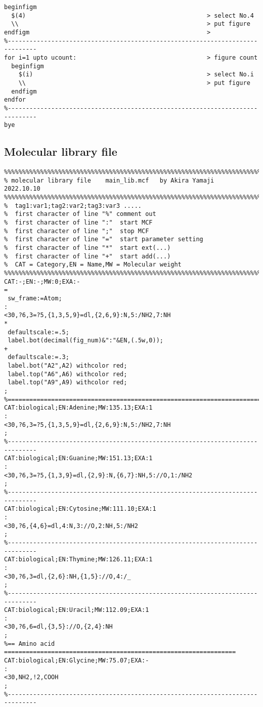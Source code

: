 \documentclass[a4paper]{article}
\begin{document}
\begin{verbatim}
beginfigm
  $(4)                                                  > select No.4
  \\                                                    > put figure
endfigm                                                 >
%------------------------------------------------------------------------------
for i=1 upto ucount:                                    > figure count
  beginfigm
    $(i)                                                > select No.i
    \\                                                  > put figure
  endfigm
endfor
%------------------------------------------------------------------------------
bye
\end{verbatim}
\noindent%
\newpage
\subsection{Molecular library file}
\begin{verbatim}
%%%%%%%%%%%%%%%%%%%%%%%%%%%%%%%%%%%%%%%%%%%%%%%%%%%%%%%%%%%%%%%%%%%%%%%%%%%%%%%
% molecular library file    main_lib.mcf   by Akira Yamaji   2022.10.10
%%%%%%%%%%%%%%%%%%%%%%%%%%%%%%%%%%%%%%%%%%%%%%%%%%%%%%%%%%%%%%%%%%%%%%%%%%%%%%%
%  tag1:var1;tag2:var2;tag3:var3 .....
%  first character of line "%" comment out
%  first character of line ":"  start MCF
%  first character of line ";"  stop MCF
%  first character of line "="  start parameter setting
%  first character of line "*"  start ext(...)
%  first character of line "+"  start add(...)
%  CAT = Category,EN = Name,MW = Molecular weight
%%%%%%%%%%%%%%%%%%%%%%%%%%%%%%%%%%%%%%%%%%%%%%%%%%%%%%%%%%%%%%%%%%%%%%%%%%%%%%%
CAT:-;EN:-;MW:0;EXA:-
=
 sw_frame:=Atom;
:
<30,?6,3=?5,{1,3,5,9}=dl,{2,6,9}:N,5:/NH2,7:NH
*
 defaultscale:=.5;
 label.bot(decimal(fig_num)&":"&EN,(.5w,0));
+
 defaultscale:=.3;
 label.bot("A2",A2) withcolor red;
 label.top("A6",A6) withcolor red;
 label.top("A9",A9) withcolor red;
;
%==============================================================================
CAT:biological;EN:Adenine;MW:135.13;EXA:1
:
<30,?6,3=?5,{1,3,5,9}=dl,{2,6,9}:N,5:/NH2,7:NH
;
%------------------------------------------------------------------------------
CAT:biological;EN:Guanine;MW:151.13;EXA:1
:
<30,?6,3=?5,{1,3,9}=dl,{2,9}:N,{6,7}:NH,5://O,1:/NH2
;
%------------------------------------------------------------------------------
CAT:biological;EN:Cytosine;MW:111.10;EXA:1
:
<30,?6,{4,6}=dl,4:N,3://O,2:NH,5:/NH2
;
%------------------------------------------------------------------------------
CAT:biological;EN:Thymine;MW:126.11;EXA:1
:
<30,?6,3=dl,{2,6}:NH,{1,5}://O,4:/_
;
%------------------------------------------------------------------------------
CAT:biological;EN:Uracil;MW:112.09;EXA:1
:
<30,?6,6=dl,{3,5}://O,{2,4}:NH
;
%== Amino acid ================================================================
CAT:biological;EN:Glycine;MW:75.07;EXA:-
:
<30,NH2,!2,COOH
;
%------------------------------------------------------------------------------
\end{verbatim}
\noindent%
\newpage
\end{document}
